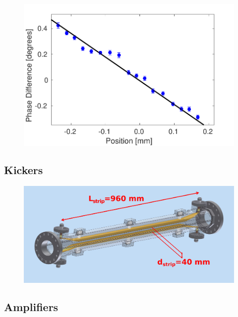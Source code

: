 \documentclass[%
 reprint,
 superscriptaddress,
 amsmath,
 amssymb,
 prstab,
]{revtex4-1}
\begin{document}
\begin{figure}
	\includegraphics[width=\columnwidth]{figs/hw/phMonHScan}%
	\caption{\label{f:phMonHScan}
	}
\end{figure}

\subsection{\label{ss:kick}Kickers}

\begin{figure}
	\includegraphics[width=\columnwidth]{figs/hw/kickerSchematic}%
	\caption{\label{f:kickerSchematic}
	}
\end{figure}

\subsection{\label{ss:amp}Amplifiers}
\end{document}
